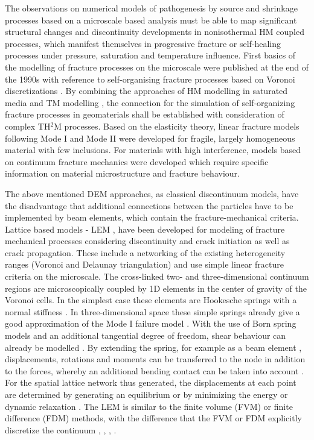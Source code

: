 The observations on numerical models of pathogenesis by source and shrinkage processes based on a microscale based analysis must be able to map significant structural changes and discontinuity developments in nonisothermal HM coupled processes, which manifest themselves in progressive fracture or self-healing processes under pressure, saturation and temperature influence. First basics of the modelling of fracture processes on the microscale were published at the end of the 1990s with reference to self-organising fracture processes based on Voronoi discretizations \cite{BolanderJr.1998569}. By combining the approaches of HM modelling in saturated media \cite{Asahina201413} and TM modelling \cite{Rizvietal2016}, the connection for the simulation of self-organizing fracture processes in geomaterials shall be established with consideration of complex TH$^2$M processes. Based on the elasticity theory, linear fracture models following Mode I and Mode II were developed for fragile, largely homogeneous material with few inclusions. For materials with high interference, models based on continuum fracture mechanics \cite{Talreja1991165} were developed which require specific information on material microstructure and fracture behaviour.

The above mentioned DEM approaches, as classical discontinuum models, have the disadvantage that additional connections between the particles have to be implemented by beam elements, which contain the fracture-mechanical criteria. Lattice based models - LEM \cite{Chessa200310},\cite{Chung199615094} have been developed for modeling of fracture mechanical processes considering discontinuity and crack initiation as well as crack propagation. These include a networking of the existing heterogeneity ranges (Voronoi and Delaunay triangulation) and use simple linear fracture criteria on the microscale. The cross-linked two- and three-dimensional continuum regions are microscopically coupled by 1D elements in the center of gravity of the Voronoi cells. In the simplest case these elements are Hookesche springs with a normal stiffness \cite{Curtin1990535}. In three-dimensional space these simple springs already give a good approximation of the Mode I failure model \cite{Wong2015417}. With the use of Born spring models and an additional tangential degree of freedom, shear behaviour can already be modelled \cite{Jagota19933123}. By extending the spring, for example as a beam element \cite{Schlangen1992435}, displacements, rotations and moments can be transferred to the node in addition to the forces, whereby an additional bending contact can be taken into account \cite{Sahimi1993713}. For the spatial lattice network thus generated, the displacements at each point are determined by generating an equilibrium or by minimizing the energy \cite{Meakin1991226} or dynamic relaxation \cite{Cundall197947}. The LEM is similar to the finite volume (FVM) or finite difference (FDM) methods, with the difference that the FVM or FDM explicitly discretize the continuum \cite{Rizvietal2019a}, \cite{Rizvietal2018a}, \cite{Rizvietal2018c}, .

